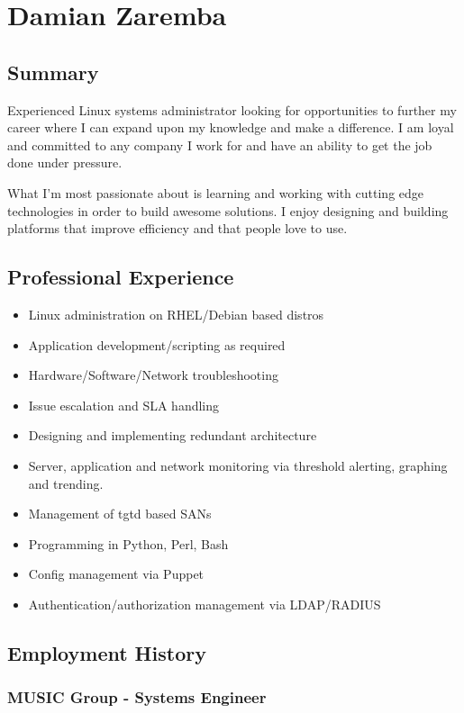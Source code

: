 \section{Damian Zaremba}

\subsection{Summary}

Experienced Linux systems administrator looking for opportunities to
further my career where I can expand upon my knowledge and make a
difference. I am loyal and committed to any company I work for and have
an ability to get the job done under pressure.

What I'm most passionate about is learning and working with cutting edge
technologies in order to build awesome solutions. I enjoy designing and
building platforms that improve efficiency and that people love to use.

\subsection{Professional Experience}

\begin{itemize}
\item
  Linux administration on RHEL/Debian based distros
\item
  Application development/scripting as required
\item
  Hardware/Software/Network troubleshooting
\item
  Issue escalation and SLA handling
\item
  Designing and implementing redundant architecture
\item
  Server, application and network monitoring via threshold alerting,
  graphing and trending.
\item
  Management of tgtd based SANs
\item
  Programming in Python, Perl, Bash
\item
  Config management via Puppet
\item
  Authentication/authorization management via LDAP/RADIUS
\end{itemize}
\subsection{Employment History}

\subsubsection{MUSIC Group - Systems Engineer}

